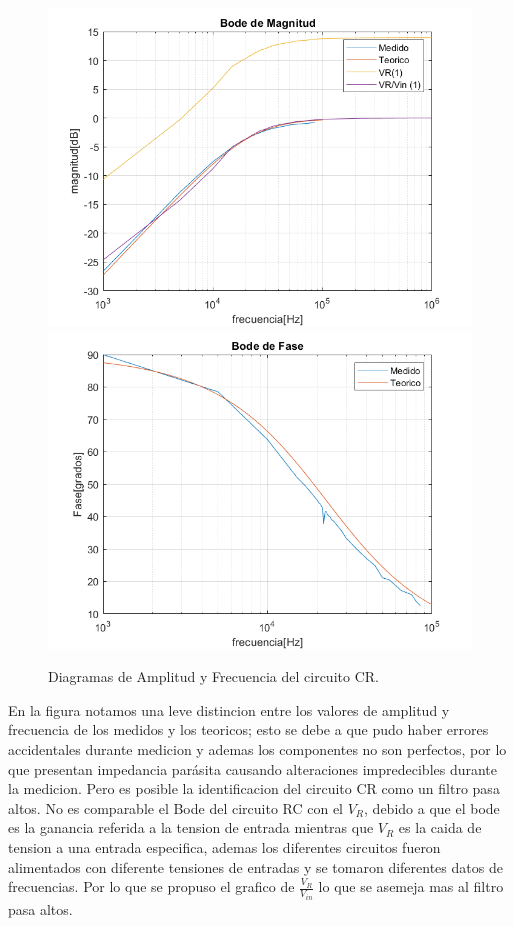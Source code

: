 \begin{figure}[h!]
\centering
\includegraphics[scale=0.5]{2Compmag.png}
\includegraphics[scale=0.5]{2Compfase.png}
\caption{Diagramas de Amplitud y Frecuencia del circuito CR.}
\label{fig:CR}
\end{figure}

En la figura notamos una leve distincion entre los valores de amplitud y frecuencia de los medidos y los teoricos; esto se debe a que pudo haber errores accidentales durante medicion y ademas los componentes no son perfectos, por lo que presentan impedancia parásita causando alteraciones impredecibles durante la medicion. Pero es posible la identificacion del circuito CR como un filtro pasa altos.
No es comparable el Bode del circuito RC con el $V_R$, debido a que el bode es la ganancia referida a la tension de entrada mientras que $V_R$ es la caida de tension a una entrada especifica, ademas los diferentes circuitos fueron alimentados con diferente tensiones de entradas y se tomaron diferentes datos de frecuencias. Por lo que se propuso el grafico de $\frac{V_R}{V_{in}}$ lo que se asemeja mas al filtro pasa altos.

